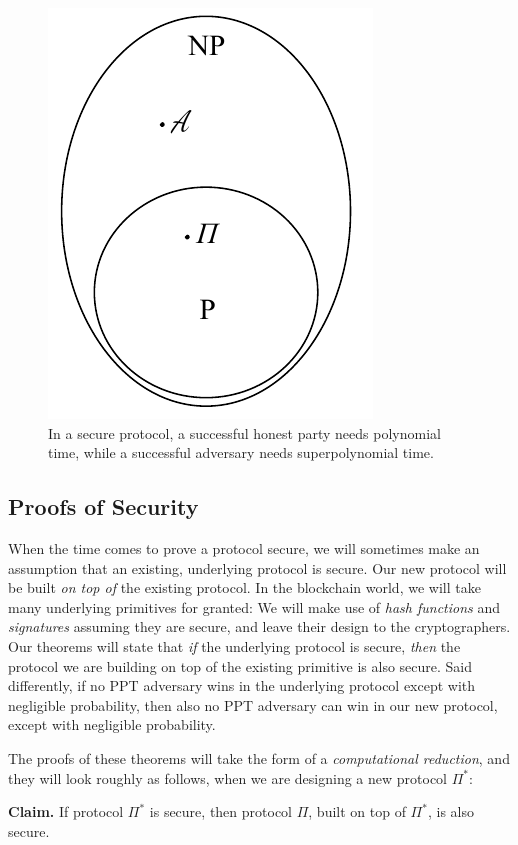 \begin{figure}[h]
    \centering
    \includegraphics[width=0.3 \columnwidth,keepaspectratio]{figures/p-vs-np.pdf}
    \caption{In a secure protocol, a successful honest party needs polynomial time,
    while a successful adversary needs superpolynomial time.}
    \label{fig.p-vs-np}
\end{figure}

\subsection*{Proofs of Security}

When the time comes to prove a protocol secure, we will sometimes make an assumption
that an existing, underlying protocol is secure. Our new protocol will be built
\emph{on top of} the existing protocol. In the blockchain world, we will take many
underlying primitives for granted: We will make use of \emph{hash functions}
and \emph{signatures} assuming they are secure, and leave their design to the
cryptographers. Our theorems will state that \emph{if} the underlying protocol is
secure, \emph{then} the protocol we are building on top of the existing primitive
is also secure. Said differently, if no PPT adversary wins in the underlying protocol
except with negligible probability, then also no PPT adversary can win in our new
protocol, except with negligible probability.

The proofs of these theorems will take the form of a \emph{computational reduction},
and they will look roughly as follows, when we are designing a new protocol $\Pi^*$:

\noindent
\textbf{Claim. } If protocol $\Pi^*$ is secure, then protocol $\Pi$, built on top of $\Pi^*$,
is also secure.

